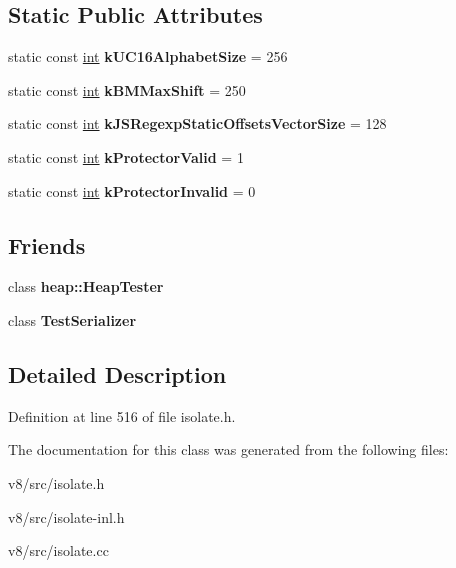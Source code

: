 \subsection*{Static Public Attributes}
\begin{DoxyCompactItemize}
\item 
\mbox{\label{classv8_1_1internal_1_1Isolate_a3af6e148b51e8342a70d3c06e9cb837f}} 
static const \mbox{\hyperlink{classint}{int}} {\bfseries k\+U\+C16\+Alphabet\+Size} = 256
\item 
\mbox{\label{classv8_1_1internal_1_1Isolate_a3d909a4000f32615b675f2007878d3fa}} 
static const \mbox{\hyperlink{classint}{int}} {\bfseries k\+B\+M\+Max\+Shift} = 250
\item 
\mbox{\label{classv8_1_1internal_1_1Isolate_ae21f1b76aadb93d7e1ac1c9eaaf07b6e}} 
static const \mbox{\hyperlink{classint}{int}} {\bfseries k\+J\+S\+Regexp\+Static\+Offsets\+Vector\+Size} = 128
\item 
\mbox{\label{classv8_1_1internal_1_1Isolate_a4e1f940af5b7cf95d1d743dd5960d8ca}} 
static const \mbox{\hyperlink{classint}{int}} {\bfseries k\+Protector\+Valid} = 1
\item 
\mbox{\label{classv8_1_1internal_1_1Isolate_a538c9ce0a4af1a38efcb14b206a3fa24}} 
static const \mbox{\hyperlink{classint}{int}} {\bfseries k\+Protector\+Invalid} = 0
\end{DoxyCompactItemize}
\subsection*{Friends}
\begin{DoxyCompactItemize}
\item 
\mbox{\label{classv8_1_1internal_1_1Isolate_a82ae4496cd3d64eb51e343ce3dcda96f}} 
class {\bfseries heap\+::\+Heap\+Tester}
\item 
\mbox{\label{classv8_1_1internal_1_1Isolate_a746d19c6c9b16ca3f602f93b4b915a5b}} 
class {\bfseries Test\+Serializer}
\end{DoxyCompactItemize}


\subsection{Detailed Description}


Definition at line 516 of file isolate.\+h.



The documentation for this class was generated from the following files\+:\begin{DoxyCompactItemize}
\item 
v8/src/isolate.\+h\item 
v8/src/isolate-\/inl.\+h\item 
v8/src/isolate.\+cc\end{DoxyCompactItemize}
